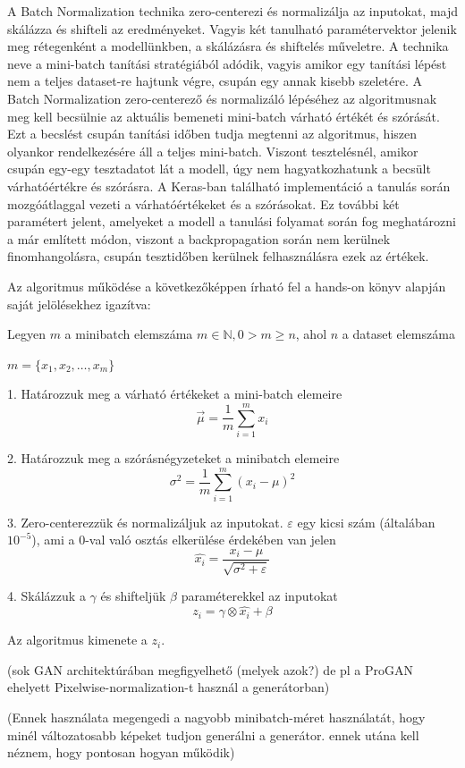 A Batch Normalization technika zero-centerezi és normalizálja az inputokat, majd skálázza és shifteli az eredményeket. Vagyis két tanulható paramétervektor jelenik meg rétegenként a modellünkben, a skálázásra és shiftelés műveletre. A technika neve a mini-batch tanítási stratégiából adódik, vagyis amikor egy tanítási lépést nem a teljes dataset-re hajtunk végre, csupán egy annak kisebb szeletére. A Batch Normalization zero-centerező és normalizáló lépéséhez az algoritmusnak meg kell becsülnie az aktuális bemeneti mini-batch várható értékét és szórását. Ezt a becslést csupán tanítási időben tudja megtenni az algoritmus, hiszen olyankor rendelkezésére áll a teljes mini-batch. Viszont tesztelésnél, amikor csupán egy-egy tesztadatot lát a modell, úgy nem hagyatkozhatunk a becsült várhatóértékre és szórásra. A Keras-ban található implementáció a tanulás során mozgóátlaggal vezeti a várhatóértékeket és a szórásokat. Ez további két paramétert jelent, amelyeket a modell a tanulási folyamat során fog meghatározni a már említett módon, viszont a backpropagation során nem kerülnek finomhangolásra, csupán tesztidőben kerülnek felhasználásra ezek az értékek.

Az algoritmus működése a következőképpen írható fel a hands-on könyv alapján saját jelölésekhez igazítva:

Legyen $m$ a minibatch elemszáma $m \in \mathbb{N}, 0 > m \ge n$, ahol $n$ a dataset elemszáma

$m = \{x_1, x_2, \ldots, x_m \}$ 

1. Határozzuk meg a várható értékeket a mini-batch elemeire
$$ \vec{\mu} = \frac{1}{m} \sum_{i=1}^{m} x_i $$

2. Határozzuk meg a szórásnégyzeteket a minibatch elemeire
$$ \sigma^2 = \frac{1}{m} \sum_{i=1}^{m} (x_i - \mu)^2 $$

3. Zero-centerezzük és normalizáljuk az inputokat. $\varepsilon$ egy kicsi szám (általában $10^{-5}$), ami a 0-val való osztás elkerülése érdekében van jelen
$$ \hat{x_i} = \frac{x_i - \mu}{\sqrt{\sigma^2 + \varepsilon}} $$

4. Skálázzuk a $\gamma$ és shifteljük $\beta$ paraméterekkel az inputokat
$$ z_i = \gamma \otimes \hat{x_i} + \beta$$

Az algoritmus kimenete a $z_i$.

(sok GAN architektúrában megfigyelhető (melyek azok?) de pl a ProGAN ehelyett Pixelwise-normalization-t használ a generátorban)

(Ennek használata megengedi a nagyobb minibatch-méret használatát, hogy minél változatosabb képeket tudjon generálni a generátor. ennek utána kell néznem, hogy pontosan hogyan működik)


